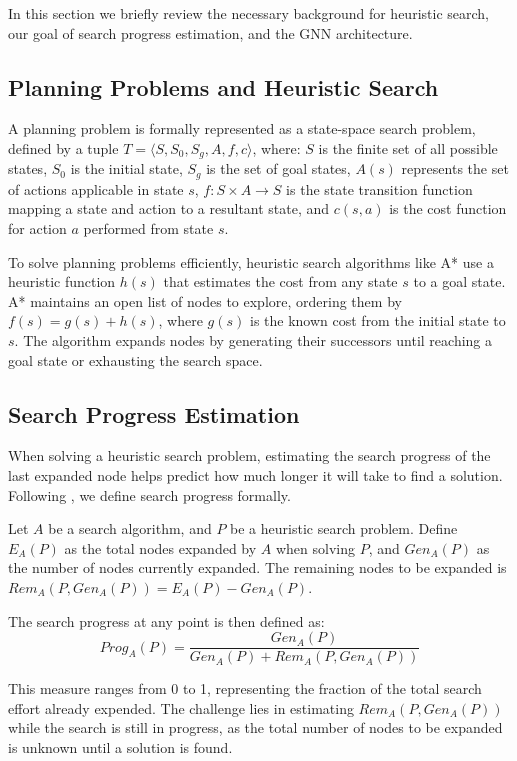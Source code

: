\documentclass[letterpaper]{article}
\begin{document}
In this section we briefly review the necessary background for heuristic search, our goal of search progress estimation, and the GNN architecture.

\subsection{Planning Problems and Heuristic Search}

A planning problem is formally represented as a state-space search problem, defined by a tuple $T = \langle S, S_0, S_g, A, f, c\rangle$, where: $S$ is the finite set of all possible states, $S_0$ is the initial state, $S_g$ is the set of goal states, $A(s)$ represents the set of actions applicable in state $s$, $f: S \times A \rightarrow S$ is the state transition function mapping a state and action to a resultant state, and $c(s,a)$ is the cost function for action $a$ performed from state $s$.

To solve planning problems efficiently, heuristic search algorithms like A* use a heuristic function $h(s)$ that estimates the cost from any state $s$ to a goal state. A* maintains an open list of nodes to explore, ordering them by $f(s) = g(s) + h(s)$, where $g(s)$ is the known cost from the initial state to $s$. The algorithm expands nodes by generating their successors until reaching a goal state or exhausting the search space.

\subsection{Search Progress Estimation}

When solving a heuristic search problem, estimating the search progress of the last expanded node helps predict how much longer it will take to find a solution. Following \cite{sudry2022learning}, we define search progress formally.

Let $A$ be a search algorithm, and $P$ be a heuristic search problem. Define $E_A(P)$ as the total nodes expanded by $A$ when solving $P$, and $Gen_A(P)$ as the number of nodes currently expanded. The remaining nodes to be expanded is $Rem_A(P, Gen_A(P)) = E_A(P) - Gen_A(P)$.

The search progress at any point is then defined as:
\begin{equation*}
    Prog_A(P) = \frac{Gen_A(P)}{Gen_A(P) + Rem_A(P, Gen_A(P))}
\end{equation*}

This measure ranges from 0 to 1, representing the fraction of the total search effort already expended. The challenge lies in estimating $Rem_A(P, Gen_A(P))$ while the search is still in progress, as the total number of nodes to be expanded is unknown until a solution is found.
\end{document}
